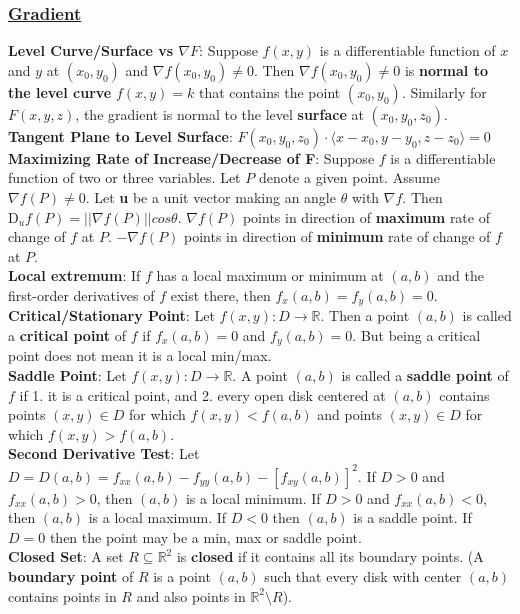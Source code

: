 \documentclass{article}
\begin{document}
\begin{multicols*}{3}
\subsubsection*{\underline{Gradient}}
\textbf{Level Curve/Surface vs $\nabla F$}: Suppose $f(x,y)$ is a differentiable function of $x$ and $y$ at $(x_0, y_0)$ and $\nabla f(x_0,y_0)\not=0$. Then $\nabla f(x_0,y_0)\not=0$ is \textbf{normal to the level curve} $f(x,y)=k$ that contains the point $(x_0, y_0)$. Similarly for $F(x,y,z)$, the gradient is normal to the level \textbf{surface} at $(x_0, y_0, z_0)$. \\
\textbf{Tangent Plane to Level Surface}: $F(x_0,y_0,z_0)\cdot\langle x-x_0,y-y_0,z-z_0\rangle=0$\\
\textbf{Maximizing Rate of Increase/Decrease of F}: Suppose $f$ is a differentiable function of two or three variables. Let $P$ denote a given point. Assume $\nabla f(P)\not=0$. Let \textbf{u} be a unit vector making an angle $\theta$ with $\nabla f$. Then $\text{D}_uf(P)=||\nabla f(P)||cos\theta$. $\nabla f(P)$ points in direction of \textbf{maximum} rate of change of $f$ at $P$. $-\nabla f(P)$ points in direction of \textbf{minimum} rate of change of $f$ at $P$.\\
\textbf{Local extremum}: If $f$ has a local maximum or minimum at $(a, b)$ and the first-order derivatives of $f$ exist there, then $f_x(a,b) = f_y(a,b) = 0.$ \\
\textbf{Critical/Stationary Point}: Let $f(x,y): D \to \mathbb{R}$. Then a point $(a,b)$ is called a \textbf{critical point} of $f$ if
$f_x(a,b) = 0$ and $f_y(a,b) = 0$. But being a critical point does not mean it is a local min/max. \\
\textbf{Saddle Point}: Let $f(x,y): D \to \mathbb{R}$. A point $(a,b)$ is called a \textbf{saddle point} of $f$ if 1. it is a critical point, and 2. every open disk centered at $(a,b)$ contains points
$(x,y) \in D$ for which $f(x,y) < f(a,b)$ and points $(x,y) \in D$ for which $f(x,y) > f(a,b)$.\\
\textbf{Second Derivative Test}: Let $D=D(a,b)=f_{xx}(a,b)-f_{yy}(a,b)-[f_{xy}(a,b)]^2$. If $D>0$ and $f_{xx}(a,b)>0$, then $(a,b)$ is a local minimum. If $D>0$ and $f_{xx}(a,b)<0$, then $(a,b)$ is a local maximum. If $D<0$ then $(a,b)$ is a saddle point. If $D=0$ then the point may be a min, max or saddle point.\\
\textbf{Closed Set}: A set $R\subseteq\mathbb{R}^2$ is \textbf{closed} if it contains all its boundary points. (A \textbf{boundary point} of $R$ is a point $(a, b)$ such that every disk with center $(a, b)$ contains points in $R$ and also points in $\mathbb{R}^2 \setminus R$).\\

\end{multicols*}
\end{document}
